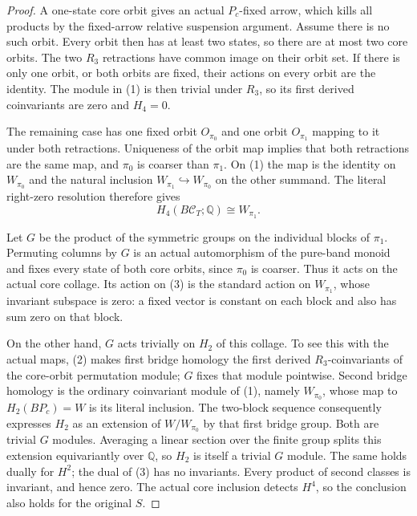 \begin{proof}
A one-state core orbit gives an actual $P_c$-fixed arrow,
which kills all products by the fixed-arrow relative
suspension argument.  Assume there is no such orbit.
Every orbit then has at least two states, so there are
at most two core orbits.
The two $R_3$ retractions have common image on their
orbit set.  If there is only one orbit, or both orbits
are fixed, their actions on every orbit are the identity.
The module in (1) is then trivial under $R_3$, so its
first derived coinvariants are zero and $H_4=0$.

The remaining case has one fixed orbit $O_{\pi_0}$
and one orbit $O_{\pi_1}$ mapping to it under both
retractions.  Uniqueness of the orbit map implies that
both retractions are the same map, and $\pi_0$ is
coarser than $\pi_1$.
On (1) the map is the identity on $W_{\pi_0}$ and the
natural inclusion $W_{\pi_1}\hookrightarrow W_{\pi_0}$
on the other summand.  The literal right-zero resolution
therefore gives
\[
 H_4(B\mathcal C_T;\mathbb Q)\cong W_{\pi_1}.                \tag{3}
\]

Let $G$ be the product of the symmetric groups on the
individual blocks of $\pi_1$.  Permuting columns by $G$
is an actual automorphism of the pure-band monoid and
fixes every state of both core orbits, since $\pi_0$ is
coarser.  Thus it acts on the actual core collage.
Its action on (3) is the standard action on $W_{\pi_1}$,
whose invariant subspace is zero: a fixed vector is
constant on each block and also has sum zero on that block.

On the other hand, $G$ acts trivially on $H_2$ of this
collage.  To see this with the actual maps, (2) makes
first bridge homology the first derived $R_3$-coinvariants
of the core-orbit permutation module; $G$ fixes that
module pointwise.  Second bridge homology is the ordinary
coinvariant module of (1), namely $W_{\pi_0}$, whose
map to $H_2(BP_c)=W$ is its literal inclusion.  The
two-block sequence consequently expresses $H_2$ as an
extension of $W/W_{\pi_0}$ by that first bridge group.
Both are trivial $G$ modules.  Averaging a linear section
over the finite group splits this extension equivariantly
over $\mathbb Q$, so $H_2$ is itself a trivial $G$ module.
The same holds dually for $H^2$; the dual of (3) has no
invariants.  Every product of second classes is invariant,
and hence zero.  The actual core inclusion detects $H^4$,
so the conclusion also holds for the original $S$.
\end{proof}

